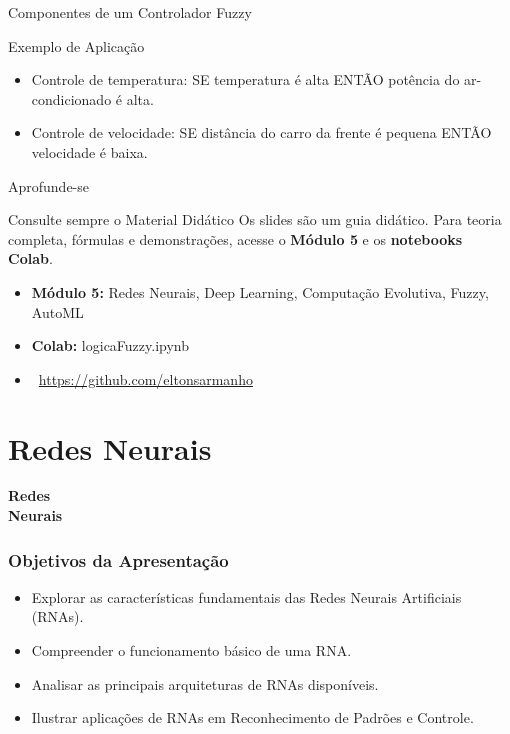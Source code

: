 \documentclass[aspectratio=169]{beamer}
\begin{document}
\begin{frame}{Componentes de um Controlador Fuzzy}
    \begin{block}{Exemplo de Aplicação}
        \begin{itemize}
            \item Controle de temperatura: SE temperatura é alta ENTÃO potência do ar-condicionado é alta.
            \item Controle de velocidade: SE distância do carro da frente é pequena ENTÃO velocidade é baixa.
        \end{itemize}
    \end{block}
\end{frame}

\begin{frame}{Aprofunde-se}
    \begin{alertblock}{Consulte sempre o Material Didático}
        Os slides são um guia didático. Para teoria completa, fórmulas e demonstrações, acesse o \textbf{Módulo 5} e os \textbf{notebooks Colab}.
    \end{alertblock}
    \begin{itemize}
        \item \textbf{Módulo 5:} Redes Neurais, Deep Learning, Computação Evolutiva, Fuzzy, AutoML
        \item \textbf{Colab:} logicaFuzzy.ipynb
        \item \faGithub\ \url{https://github.com/eltonsarmanho}
    \end{itemize}
\end{frame}

\section{Redes Neurais}
\begin{frame}
\centering
\Huge
\textbf{Redes \\ Neurais}
\end{frame}

\begin{frame}
\frametitle{Objetivos da Apresentação}
\begin{itemize}
    \item Explorar as características fundamentais das Redes Neurais Artificiais (RNAs).
    \item Compreender o funcionamento básico de uma RNA.
    \item Analisar as principais arquiteturas de RNAs disponíveis.
    \item Ilustrar aplicações de RNAs em Reconhecimento de Padrões e Controle.
\end{itemize}
\end{frame}
\end{document}
